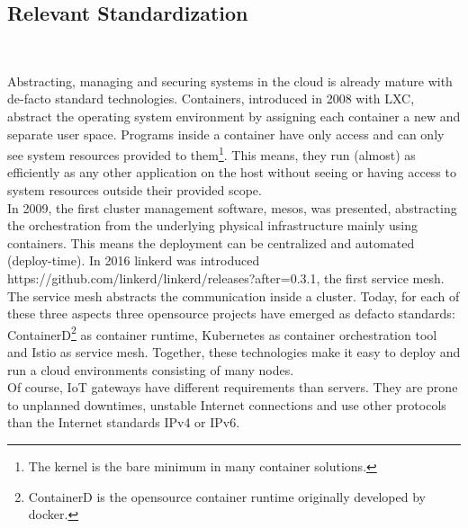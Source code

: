 \subsection{Relevant Standardization}
\

Abstracting, managing and securing systems in the cloud is already mature with de-facto standard technologies. Containers, introduced in 2008 with LXC, abstract the operating system environment by assigning each container a new and separate user space. Programs inside a container have only access and can only see system resources provided to them\footnote{The kernel is the bare minimum in many container solutions.}. This means, they run (almost) as efficiently as any other application on the host without seeing or having access to system resources outside their provided scope.\\
In 2009, the first cluster management software, mesos, was presented, abstracting the orchestration from the underlying physical infrastructure mainly using containers. This means the deployment can be centralized and automated (deploy-time). In 2016 linkerd was introduced https://github.com/linkerd/linkerd/releases?after=0.3.1, the first service mesh. The service mesh abstracts the communication inside a cluster. Today, for each of these three aspects three opensource projects have emerged as defacto standards: ContainerD\footnote{ContainerD is the opensource container runtime originally developed by docker.} as container runtime, Kubernetes as container orchestration tool and Istio as service mesh. Together, these technologies make it easy to deploy and run a cloud environments consisting of many nodes.\\
Of course, IoT gateways have different requirements than servers. They are prone to unplanned downtimes, unstable Internet connections and use other protocols than the Internet standards IPv4 or IPv6. 